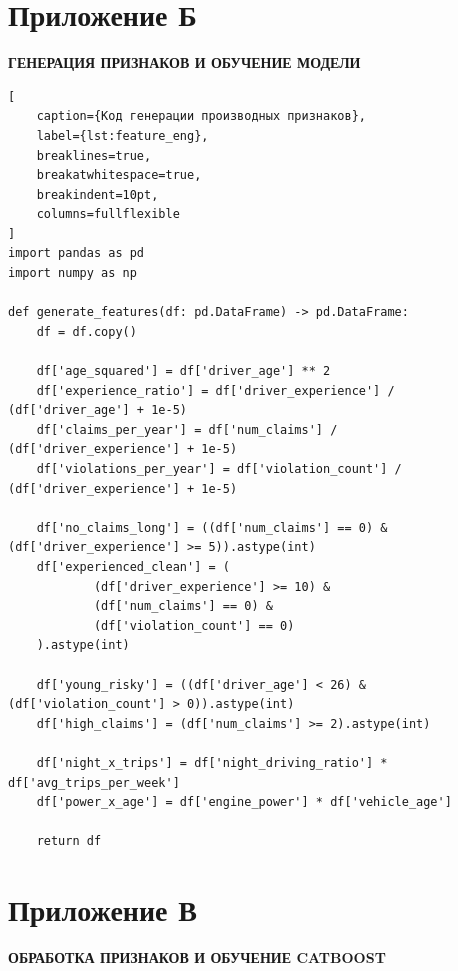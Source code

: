 \newpage
\section*{Приложение Б}
\label{app:feature_code}
\begin{center}
\textbf{ГЕНЕРАЦИЯ ПРИЗНАКОВ И ОБУЧЕНИЕ МОДЕЛИ}
\end{center}

\vspace{1cm}

\begin{lstlisting}[
    caption={Код генерации производных признаков}, 
    label={lst:feature_eng},
    breaklines=true,
    breakatwhitespace=true,
    breakindent=10pt,
    columns=fullflexible
]
import pandas as pd
import numpy as np

def generate_features(df: pd.DataFrame) -> pd.DataFrame:
    df = df.copy()

    df['age_squared'] = df['driver_age'] ** 2
    df['experience_ratio'] = df['driver_experience'] / (df['driver_age'] + 1e-5)
    df['claims_per_year'] = df['num_claims'] / (df['driver_experience'] + 1e-5)
    df['violations_per_year'] = df['violation_count'] / (df['driver_experience'] + 1e-5)

    df['no_claims_long'] = ((df['num_claims'] == 0) & (df['driver_experience'] >= 5)).astype(int)
    df['experienced_clean'] = (
            (df['driver_experience'] >= 10) &
            (df['num_claims'] == 0) &
            (df['violation_count'] == 0)
    ).astype(int)

    df['young_risky'] = ((df['driver_age'] < 26) & (df['violation_count'] > 0)).astype(int)
    df['high_claims'] = (df['num_claims'] >= 2).astype(int)

    df['night_x_trips'] = df['night_driving_ratio'] * df['avg_trips_per_week']
    df['power_x_age'] = df['engine_power'] * df['vehicle_age']

    return df
\end{lstlisting}

\newpage
\section*{Приложение В}
\label{app:training}
\begin{center}
\textbf{ОБРАБОТКА ПРИЗНАКОВ И ОБУЧЕНИЕ CATBOOST}
\end{center}

